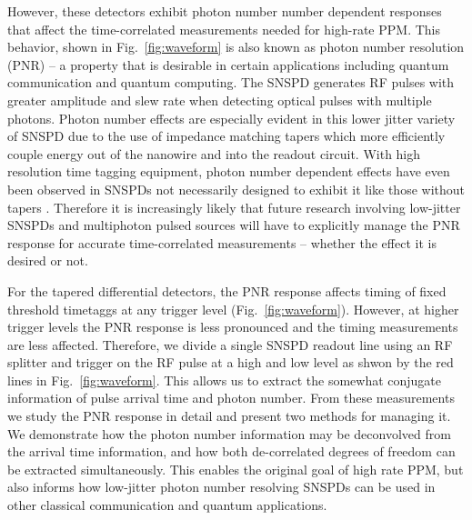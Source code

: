 \documentclass[11pt]{caltech_thesis} %
\begin{document}
However, these detectors exhibit photon number number dependent responses that affect the time-correlated measurements needed for high-rate PPM. This behavior, shown in Fig.~\ref{fig:waveform} is also known as photon number resolution (PNR) -- a property that is desirable in certain applications including quantum communication and quantum computing. The SNSPD generates RF pulses with greater amplitude and slew rate when detecting optical pulses with multiple photons. Photon number effects are especially evident in this lower jitter variety of SNSPD due to the use of impedance matching tapers which more efficiently couple energy out of the nanowire and into the readout circuit. With high resolution time tagging equipment, photon number dependent effects have even been observed in SNSPDs not necessarily designed to exhibit it \autocite{schapeler2023superconducting,sauer2023resolving} like those without tapers \autocite{Cahall2017SlewRatePNR}. Therefore it is increasingly likely that future research involving low-jitter SNSPDs and multiphoton pulsed sources will have to explicitly manage the PNR response for accurate time-correlated measurements -- whether the effect it is desired or not.

For the tapered differential detectors, the PNR response affects timing of fixed threshold timetaggs at any trigger level (Fig.~\ref{fig:waveform}). However, at higher trigger levels the PNR response is less pronounced and the timing measurements are less affected. Therefore, we divide a single SNSPD readout line using an RF splitter and trigger on the RF pulse at a high and low level as shwon by the red lines in Fig.~\ref{fig:waveform}. This allows us to extract the somewhat conjugate information of pulse arrival time and photon number. From these measurements we study the PNR response in detail and present two methods for managing it. We demonstrate how the photon number information may be deconvolved from the arrival time information, and how both de-correlated degrees of freedom can be extracted simultaneously. This enables the original goal of high rate PPM, but also informs how low-jitter photon number resolving SNSPDs can be used in other classical communication and quantum applications.
\end{document}
